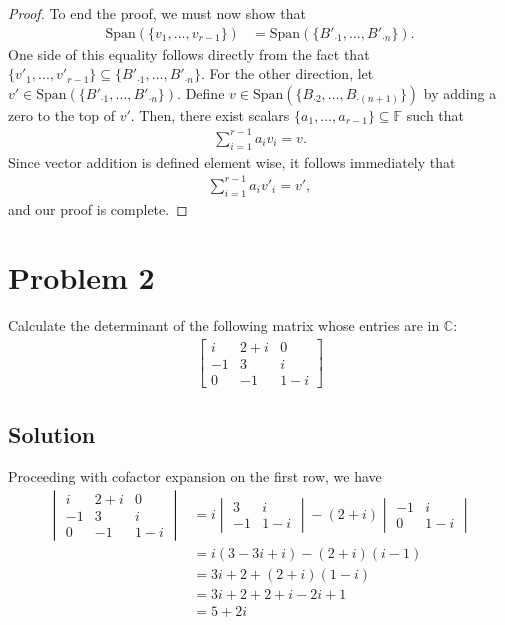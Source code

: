 \documentclass[10pt,a4paper]{article}
\theoremstyle{definition}
\begin{document}
\begin{proof}
To end the proof, we must now show that 
\begin{align*}
\text{Span}\left( \{v_1, ..., v_{r - 1} \} \right) &= \text{Span}\left( \{B'_{\cdot 1}, \dots, B'_{\cdot n} \} \right).
\end{align*}
One side of this equality follows directly from the fact that $\{v'_1, ..., v'_{r - 1} \} \subseteq \{ B'_{\cdot 1}, \dots, B'_{\cdot n} \}$. For the other direction, let $v' \in  \text{Span}\left( \{B'_{\cdot 1}, \dots, B'_{\cdot n} \} \right)$. Define $v \in \text{Span}\left( \{B_{\cdot 2}, \dots, B_{\cdot (n + 1)} \} \right)$ by adding a zero to the top of $v'$. Then, there exist scalars $\{a_1, \dots, a_{r-1} \} \subseteq \mathbb{F}$ such that 
\begin{align*}
\sum_{i = 1}^{r-1} a_i v_i = v.
\end{align*}
Since vector addition is defined element wise, it follows immediately that 
\begin{align*}
\sum_{i = 1}^{r-1} a_i v'_i = v',
\end{align*}
and our proof is complete.
\end{proof}

\section*{Problem 2}
Calculate the determinant of the following matrix whose entries are in $\mathbb{C}$:
\begin{align*}
\begin{bmatrix}
i & 2 + i & 0\\
-1 & 3 & i\\
0 & -1 & 1-i
\end{bmatrix}
\end{align*}

\subsection*{Solution}
Proceeding with cofactor expansion on the first row, we have
\begin{align*}
\begin{vmatrix}
i & 2 + i & 0\\
-1 & 3 & i\\
0 & -1 & 1-i
\end{vmatrix}
&= i \begin{vmatrix}
3 & i\\
-1 & 1-i
\end{vmatrix} - 
(2+i)\begin{vmatrix}
-1 & i\\
0 & 1-i
\end{vmatrix}\\
&= i (3 - 3i + i) - (2 + i)(i - 1)\\
&= 3i + 2 + (2 + i)(1 - i)\\
&= 3i + 2 + 2 + i - 2i + 1\\
&= 5 + 2i
\end{align*}
\end{document}
